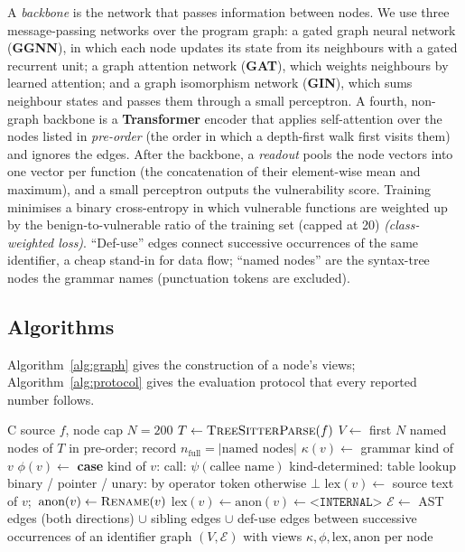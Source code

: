 A \emph{backbone} is the network that passes information between nodes. We use
three message-passing networks over the program graph: a gated graph neural
network (\textbf{GGNN}), in which each node updates its state from its
neighbours with a gated recurrent unit; a graph attention network
(\textbf{GAT}), which weights neighbours by learned attention; and a graph
isomorphism network (\textbf{GIN}), which sums neighbour states and passes them
through a small perceptron. A fourth, non-graph backbone is a \textbf{Transformer}
encoder that applies self-attention over the nodes listed in \emph{pre-order}
(the order in which a depth-first walk first visits them) and ignores the
edges. After the backbone, a \emph{readout} pools the node vectors into one
vector per function (the concatenation of their element-wise mean and
maximum), and a small perceptron outputs the vulnerability score. Training
minimises a binary cross-entropy in which vulnerable functions are weighted up
by the benign-to-vulnerable ratio of the training set (capped at 20)
\emph{(class-weighted loss)}. ``Def-use'' edges connect successive occurrences
of the same identifier, a cheap stand-in for data flow; ``named nodes'' are the
syntax-tree nodes the grammar names (punctuation tokens are excluded).

\subsection{Algorithms}
\label{sec:algorithms}

Algorithm~\ref{alg:graph} gives the construction of a node's views;
Algorithm~\ref{alg:protocol} gives the evaluation protocol that every reported
number follows.

\begin{algorithm}[t]
\caption{Program graph and node views for one function}
\label{alg:graph}
\begin{algorithmic}[1]
\REQUIRE C source $f$, node cap $N=200$
\STATE $T \leftarrow \textsc{TreeSitterParse}(f)$
\STATE $V \leftarrow$ first $N$ named nodes of $T$ in pre-order; record $n_{\text{full}}=|\text{named nodes}|$
  \STATE $\kappa(v) \leftarrow$ grammar kind of $v$
  \STATE $\phi(v) \leftarrow$ \textbf{case} kind of $v$:
  \STATE \quad call: $\psi(\text{callee name})$ 
  \STATE \quad kind-determined: table lookup 
  \STATE \quad binary / pointer / unary: by operator token
  \STATE \quad otherwise $\bot$
     \STATE $\text{lex}(v) \leftarrow$ source text of $v$;\ $\text{anon}(v) \leftarrow \textsc{Rename}(v)$ 
  \ELSE
     \STATE $\text{lex}(v) \leftarrow \text{anon}(v) \leftarrow \texttt{<INTERNAL>}$
  \ENDIF
\ENDFOR
\STATE $\mathcal{E} \leftarrow$ AST edges (both directions) $\cup$ sibling edges $\cup$ def-use edges between successive occurrences of an identifier
\RETURN graph $(V,\mathcal{E})$ with views $\kappa,\phi,\text{lex},\text{anon}$ per node
\end{algorithmic}
\end{algorithm}


